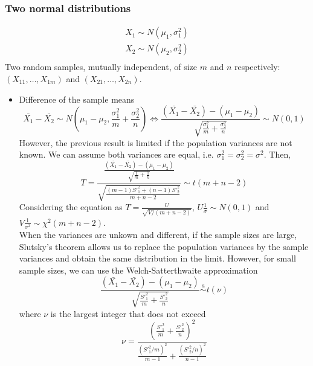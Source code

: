 \subsubsection{Two normal distributions}
\begin{gather*}
    X_1\sim N(\mu_1,\sigma_1^2)\\
    X_2\sim N(\mu_2,\sigma_2^2)\\
\end{gather*}
Two random samples, mutually independent, of size $m$ and $n$ respectively: $(X_{11},\ldots,X_{1m})$ and $(X_{21},\ldots,X_{2n})$.
\begin{itemize}
    \item Difference of the sample means
        \begin{equation*}
            \bar{X_1}-\bar{X_2} \sim N(\mu_1 - \mu_2, \frac{\sigma_1^2}{m} + \frac{\sigma_2^2}{n}) \Leftrightarrow 
            \frac{(\bar{X_1}-\bar{X_2}) - (\mu_1 - \mu_2)}{\sqrt{\frac{\sigma_1^2}{m} + \frac{\sigma_2^2}{n}}} \sim N(0,1)
        \end{equation*}
        However, the previous result is limited if the population variances are not known.
        We can assume both variances are equal, i.e. $\sigma_1^2 = \sigma_2^2 = \sigma^2$.
        Then,
        \begin{equation*}
            T = \frac{\frac{(\bar{X_1}-\bar{X_2}) - (\mu_1 - \mu_2)}{\sqrt{\frac{1}{m} + \frac{1}{n}}}}{\sqrt{\frac{(m-1)S'^2_1+(n-1)S'^2_2}{m+n-2}}} \sim t(m+n-2)
        \end{equation*}
        Considering the equation as $T = \frac{U}{\sqrt{V/(m+n-2)}}$, $U\frac{1}{\sigma}\sim N(0,1)$ and $V\frac{1}{\sigma^2}\sim \chi^2(m+n-2)$.\\
        When the variances are unkown and different, if the sample sizes are large, Slutsky's theorem allows us to replace the population variances by the sample variances
        and obtain the same distribution in the limit. However, for small sample sizes, we can use the Welch-Satterthwaite approximation
        \begin{equation*}
            \frac{(\bar{X_1}-\bar{X_2})-(\mu_1-\mu_2)}{\sqrt{\frac{S'^2_1}{m}+\frac{S'^2_2}{n}}}\overset{a}{\sim} t(\nu)
        \end{equation*}
        where $\nu$ is the largest integer that does not exceed
        \begin{equation*}
            \nu = \frac{\left(\frac{S'^2_1}{m} + \frac{S'^2_2}{n}\right)^2}{\frac{(S'^2_1/m)^2}{m-1} + \frac{(S'^2_2/n)^2}{n-1}}
        \end{equation*}

\end{itemize}
